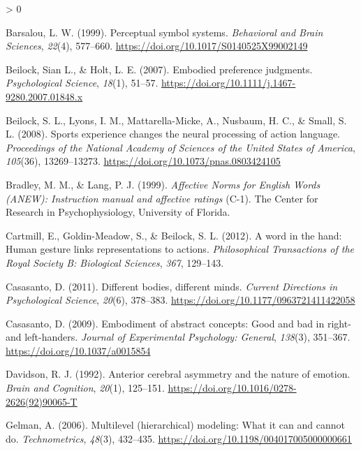 \documentclass[
  english,
  man]{apa7}
\newlength{\cslhangindent}
\newenvironment{CSLReferences}[2] %
 {%
  \setlength{\parindent}{0pt}
  \ifodd #1 \everypar{\setlength{\hangindent}{\cslhangindent}}\ignorespaces\fi
  \ifnum #2 > 0
  \setlength{\parskip}{#2\baselineskip}
  \fi
 }%
 {}
\begin{document}
\hypertarget{refs}{}
\begin{CSLReferences}{1}{0}
\leavevmode\hypertarget{ref-Barsalou1999}{}%
Barsalou, L. W. (1999). {Perceptual symbol systems}. \emph{Behavioral and Brain Sciences}, \emph{22}(4), 577--660. \url{https://doi.org/10.1017/S0140525X99002149}

\leavevmode\hypertarget{ref-Beilock2007}{}%
Beilock, Sian L., \& Holt, L. E. (2007). {Embodied preference judgments}. \emph{Psychological Science}, \emph{18}(1), 51--57. \url{https://doi.org/10.1111/j.1467-9280.2007.01848.x}

\leavevmode\hypertarget{ref-Beilock2008}{}%
Beilock, S. L., Lyons, I. M., Mattarella-Micke, A., Nusbaum, H. C., \& Small, S. L. (2008). {Sports experience changes the neural processing of action language}. \emph{Proceedings of the National Academy of Sciences of the United States of America}, \emph{105}(36), 13269--13273. \url{https://doi.org/10.1073/pnas.0803424105}

\leavevmode\hypertarget{ref-Bradley1999}{}%
Bradley, M. M., \& Lang, P. J. (1999). \emph{{Affective Norms for English Words (ANEW): Instruction manual and affective ratings}} (C-1). The Center for Research in Psychophysiology, University of Florida.

\leavevmode\hypertarget{ref-Cartmill2012}{}%
Cartmill, E., Goldin-Meadow, S., \& Beilock, S. L. (2012). {A word in the hand: Human gesture links representations to actions}. \emph{Philosophical Transactions of the Royal Society B: Biological Sciences}, \emph{367}, 129--143.

\leavevmode\hypertarget{ref-Casasanto2011}{}%
Casasanto, D. (2011). {Different bodies, different minds}. \emph{Current Directions in Psychological Science}, \emph{20}(6), 378--383. \url{https://doi.org/10.1177/0963721411422058}

\leavevmode\hypertarget{ref-Casasanto2009}{}%
Casasanto, D. (2009). {Embodiment of abstract concepts: Good and bad in right- and left-handers.} \emph{Journal of Experimental Psychology: General}, \emph{138}(3), 351--367. \url{https://doi.org/10.1037/a0015854}

\leavevmode\hypertarget{ref-Davidson1992}{}%
Davidson, R. J. (1992). {Anterior cerebral asymmetry and the nature of emotion}. \emph{Brain and Cognition}, \emph{20}(1), 125--151. \url{https://doi.org/10.1016/0278-2626(92)90065-T}

\leavevmode\hypertarget{ref-Gelman2006}{}%
Gelman, A. (2006). {Multilevel (hierarchical) modeling: What it can and cannot do.} \emph{Technometrics}, \emph{48}(3), 432--435. \url{https://doi.org/10.1198/004017005000000661}


\end{CSLReferences}
\end{document}
